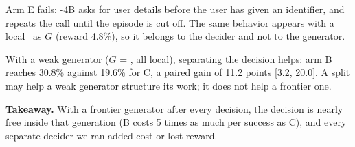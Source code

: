 Arm E fails: \kev-4B asks for user details before the user has given an identifier, and repeats the call until the episode is cut off.
The same behavior appears with a local \qwen\ as $G$ (reward 4.8\%), so it belongs to the decider and not to the generator.

With a weak generator ($G$ = \qwen, all local), separating the decision helps: arm B reaches 30.8\% against 19.6\% for C, a paired gain of 11.2 points [3.2, 20.0].
A split may help a weak generator structure its work; it does not help a frontier one.

\textbf{Takeaway.} With a frontier generator after every decision, the decision is nearly free inside that generation (B costs 5 times as much per success as C), and every separate decider we ran added cost or lost reward.
